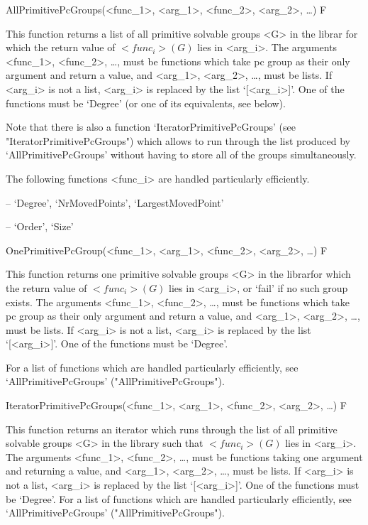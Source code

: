 

\>AllPrimitivePcGroups(<func_1>, <arg_1>, <func_2>, <arg_2>, \dots) F

This function returns a list of all primitive solvable 
groups <G> in the  {\IRREDSOL} librar for which the return value of $<func_i>(G)$ lies
in <arg_i>.  The arguments <func_1>, <func_2>, \dots,
must be {\GAP} functions which take pc group as their only argument and return a
value, and <arg_1>, <arg_2>,
\dots,  must be lists. If <arg_i> is not a list, <arg_i> is replaced by the list
`[<arg_i>]'. One of the functions must be `Degree' (or one of its
equivalents, see below).

Note that there is also a function `IteratorPrimitivePcGroups' (see
"IteratorPrimitivePcGroups") which allows to run through the list produced by
`AllPrimitivePcGroups' without having to store all of the groups
simultaneously.

The following functions <func_i> are handled particularly efficiently. 

\beginlist

\item{--} `Degree', `NrMovedPoints', `LargestMovedPoint'
\item{--} `Order', `Size'
\endlist

\>OnePrimitivePcGroup(<func_1>, <arg_1>, <func_2>, <arg_2>, \dots) F

This function returns one primitive solvable 
groups <G> in the  {\IRREDSOL} librarfor which the return value of $<func_i>(G)$ lies in
<arg_i>, or `fail' if no such group exists.  The arguments <func_1>, <func_2>, \dots,
must be {\GAP} functions which take pc group as their only argument and return a
value, and <arg_1>, <arg_2>,
\dots,  must be lists. If <arg_i> is not a list, <arg_i> is replaced by the list
`[<arg_i>]'. One of the functions must be `Degree'.

For a list of functions which are handled particularly efficiently, see
`AllPrimitivePcGroups' ("AllPrimitivePcGroups").

\>IteratorPrimitivePcGroups(<func_1>, <arg_1>, <func_2>, <arg_2>, \dots) F

This function returns an iterator which runs through the list of all primitive solvable
groups <G> in the  {\IRREDSOL} library such that
$<func_i>(G)$ lies in <arg_i>. The arguments <func_1>, <func_2>, \dots,
must be {\GAP} functions taking one argument and returning a value, and <arg_1>, <arg_2>, \dots, 
must be lists. If <arg_i> is not a list, <arg_i> is replaced by the list `[<arg_i>]'.
One of the functions must be `Degree'.
For a list of functions which are handled particularly efficiently, see
`AllPrimitivePcGroups' ("AllPrimitivePcGroups").

